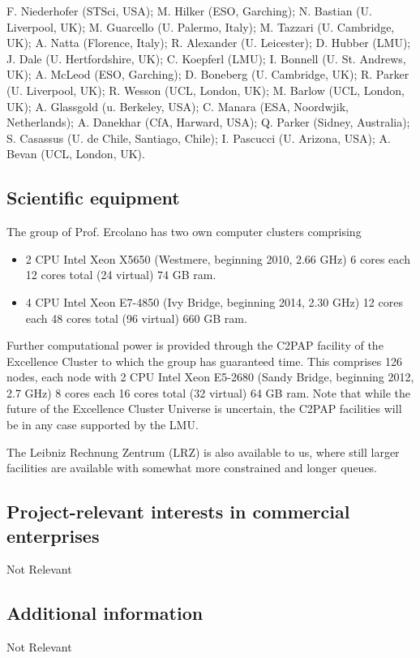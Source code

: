 \documentclass[10pt,fleqn,twoside]{article}
\newcommand{\Tcol}{\color{blue}}
\begin{document}
F. Niederhofer (STSci, USA); M. Hilker (ESO, Garching); N. Bastian (U. Liverpool,
UK); M. Guarcello (U. Palermo, Italy); M. Tazzari (U. Cambridge, UK);
A. Natta (Florence, Italy); R. Alexander (U. Leicester); D. Hubber
(LMU); J. Dale (U. Hertfordshire, UK); C. Koepferl (LMU); I. Bonnell
(U. St. Andrews, UK); A. McLeod (ESO, Garching); D. Boneberg
(U. Cambridge, UK); R. Parker (U. Liverpool, UK); R. Wesson (UCL,
London, UK); M. Barlow (UCL, London, UK); A. Glassgold (u. Berkeley,
USA); C. Manara (ESA, Noordwjik, Netherlands); A. Danekhar (CfA,
Harward, USA); Q. Parker (Sidney, Australia); S. Casassus
(U. de Chile, Santiago, Chile); I. Pascucci (U. Arizona, USA);
A. Bevan (UCL, London, UK).

\subsection{\Tcol Scientific equipment}

The group of Prof. Ercolano has two own computer clusters comprising 

\begin{itemize}
\item 2 CPU Intel Xeon X5650 (Westmere, beginning
2010, 2.66 GHz) 6 cores each 12 cores total (24 virtual) 74 GB ram.

\item 4 CPU Intel Xeon E7-4850 (Ivy Bridge, beginning 2014, 2.30 GHz)
12 cores each 48 cores total (96 virtual) 660 GB ram.

\end{itemize}

Further computational power is provided through the C2PAP facility of the Excellence Cluster to which
the group has guaranteed time. This comprises 126 nodes, each node with 2 CPU Intel Xeon E5-2680 (Sandy
Bridge, beginning 2012, 2.7 GHz) 8 cores each 16 cores total (32
virtual) 64 GB ram. Note that while the future of the Excellence
Cluster Universe is uncertain, the C2PAP facilities will be in any
case supported by the LMU. 

The Leibniz Rechnung Zentrum (LRZ) is also available to us, where still
larger facilities are available with somewhat more constrained and longer queues.

\subsection{\Tcol Project-relevant interests in commercial enterprises}

Not Relevant


\subsection{\Tcol Additional information}

Not Relevant
\end{document}
